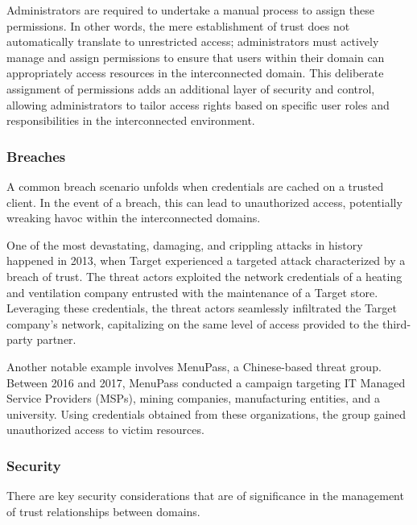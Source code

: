 Administrators are required to undertake a manual process to assign these permissions. In other words, the mere establishment of trust does not automatically translate to unrestricted access; administrators must actively manage and assign permissions to ensure that users within their domain can appropriately access resources in the interconnected domain. This deliberate assignment of permissions adds an additional layer of security and control, allowing administrators to tailor access rights based on specific user roles and responsibilities in the interconnected environment.

\subsubsection{Breaches}
A common breach scenario unfolds when credentials are cached on a trusted client. In the event of a breach, this can lead to unauthorized access, potentially wreaking havoc within the interconnected domains.

One of the most devastating, damaging, and crippling attacks in history happened in 2013, when Target experienced a targeted attack characterized by a breach of trust. The threat actors exploited the network credentials of a heating and ventilation company entrusted with the maintenance of a Target store. Leveraging these credentials, the threat actors seamlessly infiltrated the Target company's network, capitalizing on the same level of access provided to the third-party partner.

Another notable example involves MenuPass, a Chinese-based threat group. Between 2016 and 2017, MenuPass conducted a campaign targeting IT Managed Service Providers (MSPs), mining companies, manufacturing entities, and a university. Using credentials obtained from these organizations, the group gained unauthorized access to victim resources.

\subsubsection{Security}
There are key security considerations that are of significance in the management of trust relationships between domains.

